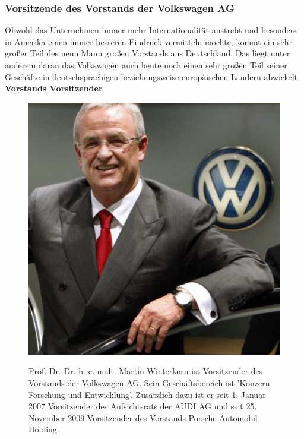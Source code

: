 \documentclass[12pt]{article}
\begin{document}
\subsubsection{Vorsitzende des Vorstands der Volkswagen AG}
Obwohl das Unternehmen immer mehr Internationalität anstrebt und besonders in Amerika einen immer besseren Eindruck vermitteln möchte, kommt ein sehr großer Teil des neun Mann großen Vorstands aus Deutschland. Das liegt unter anderem daran das Volkswagen auch heute noch einen sehr großen Teil seiner Geschäfte in deutschsprachigen beziehungsweise europäischen Ländern abwickelt.\cite{vorstand}
\textbf{Vorstands Vorsitzender}
\begin{figure}[here!]
	\centering
	\begin{minipage}[h]{0.20\textwidth}
		\centering
		\includegraphics[width=1.0\textwidth]{images/MartinWinterkorn.jpg}
		\label{fig:vorstandvw0}
		\cite{mwpic}
	\end{minipage}
		\begin{minipage}[h]{0.10\textwidth}
		\hspace{1cm} 
	\end{minipage}
	\begin{minipage}[h]{0.65\textwidth}
		Prof. Dr. Dr. h. c. mult. Martin Winterkorn ist Vorsitzender des Vorstands der Volkswagen AG. Sein Geschäftsbereich ist 'Konzern Forschung und Entwicklung'. Zusätzlich dazu ist er seit 1. Januar 2007 Vorsitzender des Aufsichtsrats der AUDI AG und seit 25. November 2009 Vorsitzender des Vorstands Porsche Automobil Holding.
	\end{minipage}
\end{figure}\FloatBarrier\noindent
\end{document}
